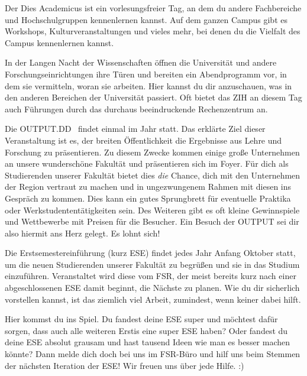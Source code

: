 Der Dies Academicus ist ein vorlesungsfreier Tag, an dem du andere Fachbereiche und Hochschulgruppen kennenlernen kannst. Auf dem ganzen Campus gibt es Workshops, Kulturveranstaltungen und vieles mehr, bei denen du die Vielfalt des Campus kennenlernen kannst.


In der Langen Nacht der Wissenschaften öffnen die Universität und andere Forschungseinrichtungen ihre Türen und bereiten ein Abendprogramm vor, in dem sie vermitteln, woran sie arbeiten. Hier kannst du dir anzuschauen, was in den anderen Bereichen der Universität passiert. Oft bietet das ZIH an diesem Tag auch Führungen durch das durchaus beeindruckende Rechenzentrum an.


Die OUTPUT.DD~ findet einmal im Jahr statt. Das erklärte Ziel dieser Veranstaltung ist es, der breiten Öffentlichkeit die Ergebnisse aus Lehre und Forschung zu präsentieren. Zu diesem Zwecke kommen einige große Unternehmen an unsere wunderschöne Fakultät und präsentieren sich im Foyer. Für dich als Studierenden unserer Fakultät bietet dies \emph{die} Chance, dich mit den Unternehmen der Region vertraut zu machen und in ungezwungenem Rahmen mit diesen ins Gespräch zu kommen. Dies kann ein gutes Sprungbrett für eventuelle Praktika oder Werkstudententätigkeiten sein. Des Weiteren gibt es oft kleine Gewinnspiele und Wettbewerbe mit Preisen für die Besucher. Ein Besuch der OUTPUT sei dir also hiermit ans Herz gelegt. Es lohnt sich!


Die Erstsemestereinführung (kurz ESE) findet jedes Jahr Anfang Oktober statt, um die neuen Studierenden unserer Fakultät zu begrüßen und sie in das Studium einzuführen.
Veranstaltet wird diese vom FSR, der meist bereits kurz nach einer abgeschlossenen ESE damit beginnt, die Nächste zu planen.
Wie du dir sicherlich vorstellen kannst, ist das ziemlich viel Arbeit, zumindest, wenn keiner dabei hilft.

Hier kommst du ins Spiel. Du fandest deine ESE super und möchtest dafür sorgen, dass auch alle weiteren Erstis eine super ESE haben?
Oder fandest du deine ESE absolut grausam und hast tausend Ideen wie man es besser machen könnte?
Dann melde dich doch bei uns im FSR-Büro und hilf uns beim Stemmen der nächsten Iteration der ESE! Wir freuen uns über jede Hilfe. :)



